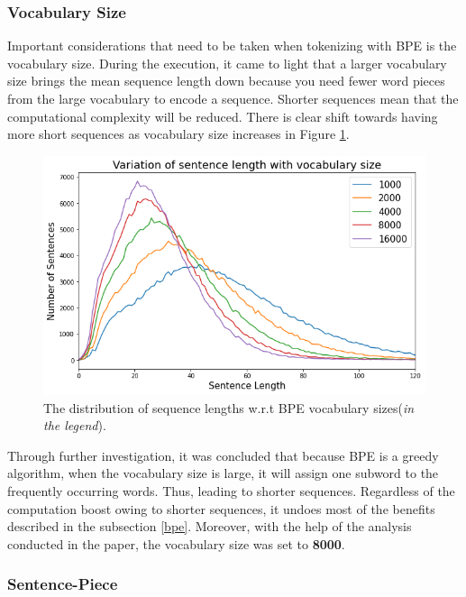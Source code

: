 \documentclass[12pt,a4paper,twoside,openright]{report}
\begin{document}
\subsubsection{Vocabulary Size}
Important considerations that need to be taken when tokenizing with BPE is the vocabulary size. During the execution, it came to light that a larger vocabulary size brings the mean sequence length down because you need fewer word pieces from the large vocabulary to encode a sequence. Shorter sequences mean that the computational complexity will be reduced. There is clear shift towards having more short sequences as vocabulary size increases in Figure \ref{fig:sentence-length-vs-vocab-size}.

\begin{figure}[H]
    \centering
    \includegraphics[width=\textwidth*5/8]{figs/length-vs-vocab-size.png}
    \caption{The distribution of sequence lengths w.r.t BPE vocabulary sizes(\textit{in the legend}). }
    \label{fig:sentence-length-vs-vocab-size}
\end{figure}
Through further investigation, it was concluded that because BPE is a greedy algorithm, when the vocabulary size is large, it will assign one subword to the frequently occurring words. Thus, leading to shorter sequences. Regardless of the computation boost owing to shorter sequences, it undoes most of the benefits described in the subsection \ref{bpe}. Moreover, with the help of the analysis conducted in the paper\cite{vocabsize}, the vocabulary size was set to \textbf{8000}.

\subsubsection{Sentence-Piece}
\end{document}
